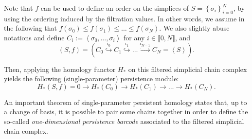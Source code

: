 \documentclass{article}
\begin{document}
Note that $f$ can be used to define an order on the simplices of $S = \left\{ \sigma_i\right\}_{i=0}^N$, by using the ordering induced by the filtration values.
In other words, we assume in the following that $f(\sigma_0) \le f(\sigma_1) \le \dots \le f(\sigma_N)$.
We also slightly abuse notations and define $C_i := \left< \sigma_0, \dots,
\sigma_i \right>$ for any $i\in\llbracket 0,N \rrbracket$, and
\begin{equation}
	(S,f) = \left(C_0 \overset {\iota_0} \hookrightarrow C_1 \overset {\iota_1}\hookrightarrow \dots \overset {\iota_{N-1}}\hookrightarrow C_N = \left<S\right>\right).
\end{equation}

Then, applying the homology functor $H_{*}$ on this filtered simplicial chain
complex yields the following (single-parameter) persistence module:
\begin{equation*}
	H_*(S,f) = 0
	\rightarrow
	H_*(C_0)
	\rightarrow
	H_*(C_1)
	\rightarrow
	\dots
	\rightarrow
	H_* (C_N).
\end{equation*}

An important theorem of single-parameter persistent homology states that, up to a change of basis, it is possible to pair some chains together in order
to define the so-called {\em one-dimensional persistence barcode} associated to the filtered simplicial chain complex.  \\
\end{document}
